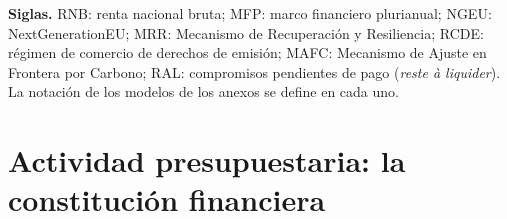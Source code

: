 \documentclass[11pt]{article}
\begin{document}
\begin{anotaciones}
\textbf{Siglas.} RNB: renta nacional bruta; MFP: marco financiero plurianual; NGEU: NextGenerationEU; MRR: Mecanismo de Recuperación y Resiliencia; RCDE: régimen de comercio de derechos de emisión; MAFC: Mecanismo de Ajuste en Frontera por Carbono; RAL: compromisos pendientes de pago (\emph{reste à liquider}). La notación de los modelos de los anexos se define en cada uno.
\end{anotaciones}

\section{Actividad presupuestaria: la constitución financiera}\label{sec:marco}
\end{document}

